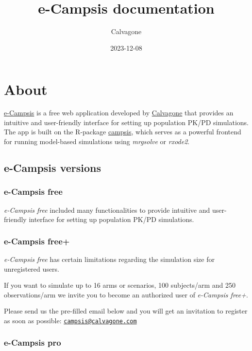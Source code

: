 \documentclass[
]{book}
\title{e-Campsis documentation}
\author{Calvagone}
\date{2023-12-08}
\begin{document}
\maketitle

{
\setcounter{tocdepth}{1}
\tableofcontents
}
\hypertarget{about}{%
\chapter{About}\label{about}}

\href{https://ecampsis.shinyapps.io/free/}{e-Campsis} is a free web application developed by \href{https://www.calvagone.com/}{Calvagone} that provides an intuitive and user-friendly interface for setting up population PK/PD simulations.
The app is built on the R-package \href{https://calvagone.github.io/}{campsis}, which serves as a powerful frontend for running model-based simulations using \emph{mrgsolve} or \emph{rxode2}.

\hypertarget{e-campsis-versions}{%
\section{e-Campsis versions}\label{e-campsis-versions}}

\hypertarget{e-campsis-free}{%
\subsection{e-Campsis free}\label{e-campsis-free}}

\emph{e-Campsis free} included many functionalities to provide intuitive and user-friendly interface for setting up population PK/PD simulations.

\hypertarget{e-campsis-free-1}{%
\subsection{e-Campsis free+}\label{e-campsis-free-1}}

\emph{e-Campsis free} has certain limitations regarding the simulation size for unregistered users.

If you want to simulate up to 16 arms or scenarios, 100 subjects/arm and 250 observations/arm we invite you to become an authorized user of \emph{e-Campsis free+}.

Please send us the pre-filled email below and you will get an invitation to register as soon as possible: \href{mailto:campsis@calvagone.com}{\nolinkurl{campsis@calvagone.com}}

\hypertarget{e-campsis-pro}{%
\subsection{e-Campsis pro}\label{e-campsis-pro}}
\end{document}
